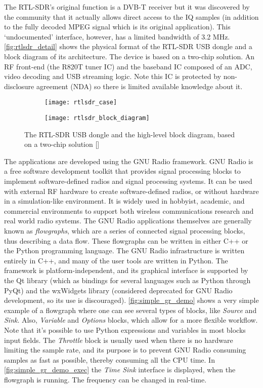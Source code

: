The RTL-SDR's original function is a DVB-T receiver but it was discovered by the community that it actually allows direct access to the IQ samples (in addition to the fully decoded MPEG signal which is its original application). This `undocumented' interface, however, has a limited bandwidth of 3.2 MHz. \autoref{fig:rtlsdr_detail} shows the physical format of the RTL-SDR USB dongle and a block diagram of its architecture. The device is based on a two-chip solution. An RF front-end (the R820T tuner IC) and the baseband IC composed of an ADC, video decoding and USB streaming logic. Note this IC is protected by non-disclosure agreement (NDA) so there is limited available knowledge about it.

\begin{figure} [ht]
  \begin{subfigure}{.5\textwidth}
    \centering
    \texttt{[image: rtlsdr\_case]}
    \label{fig:rtlsdr_case}
  \end{subfigure}
  \begin{subfigure}{.5\textwidth}
    \centering
    \texttt{[image: rtlsdr\_block\_diagram]}
    \label{fig:rtlsdr_block_diagram}
  \end{subfigure}
  \caption{The RTL-SDR USB dongle and the high-level block diagram, based on a two-chip solution [\citeauthor{rtlsdr_product}]}
  \label{fig:rtlsdr_detail}
\end{figure}

The applications are developed using the GNU Radio framework. GNU Radio is a free software development toolkit that provides signal processing blocks to implement software-defined radios and signal processing systems. It can be used with external RF hardware to create software-defined radios, or without hardware in a simulation-like environment. It is widely used in hobbyist, academic, and commercial environments to support both wireless communications research and real world radio systems. The GNU Radio applications themselves are generally known as \emph{flowgraphs}, which are a series of connected signal processing blocks, thus describing a data flow. These flowgraphs can be written in either C++ or the Python programming language. The GNU Radio infrastructure is written entirely in C++, and many of the user tools are written in Python. The framework is platform-independent, and its graphical interface is supported by the Qt library (which as bindings for several languages such as Python through PyQt) and the wxWidgets library (considered deprecated for GNU Radio development, so its use is discouraged).
\autoref{fig:simple_gr_demo} shows a very simple example of a flowgraph where one can see several types of blocks, like \emph{Source} and \emph{Sink}. Also, \emph{Variable} and \emph{Options} blocks, which allow for a more flexible workflow. Note that it's possible to use Python expressions and variables in most blocks input fields. The \emph{Throttle} block is usually used when there is no hardware limiting the sample rate, and its purpose is to prevent GNU Radio consuming samples as fast as possible, thereby consuming all the CPU time. In \autoref{fig:simple_gr_demo_exec} the \emph{Time Sink} interface is displayed, when the flowgraph is running. The frequency can be changed in real-time.

